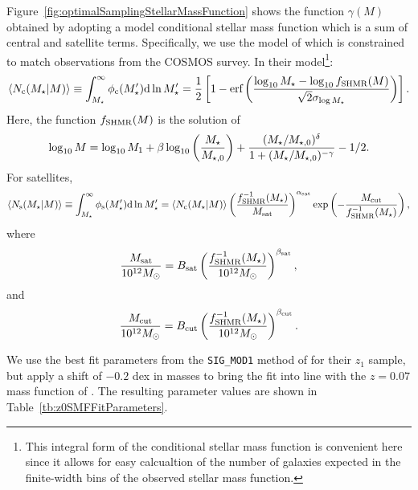 Figure~\ref{fig:optimalSamplingStellarMassFunction} shows the function $\gamma(M)$ obtained by adopting a model conditional stellar mass function which is a sum of central and satellite terms. Specifically, we use the model of \cite{leauthaud_new_2011} which is constrained to match observations from the COSMOS survey. In their model\footnote{This integral form of the conditional stellar mass function is convenient here since it allows for easy calcualtion of the number of galaxies expected in the finite-width bins of the observed stellar mass function.}:
\begin{equation}
 \langle N_{\rm c}(M_\star|M)\rangle \equiv \int_{M_\star}^\infty \phi_{\rm c}(M_\star^\prime) \d \ln M_\star^\prime = {1 \over 2} \left[ 1 - \hbox{erf}\left( {\log_{10}M_\star - \log_{10} f_{\rm SHMR}(M) \over \sqrt{2}\sigma_{\log M_\star}} \right) \right].
\end{equation}
Here, the function $f_{\rm SHMR}(M)$ is the solution of
\begin{equation}
 \log_{10}M = \log_{10}M_1 + \beta \log_{10}\left({M_\star \over M_{\star,0}}\right) + {(M_\star/M_{\star,0})^\delta \over 1 + (M_\star/M_{\star,0})^{-\gamma}} - {1/2}.
\end{equation}
For satellites,
\begin{equation}
 \langle N_{\rm s}(M_\star|M)\rangle \equiv \int_{M_\star}^\infty \phi_{\rm s}(M_\star^\prime) \d \ln M_\star^\prime =  \langle N_{\rm c}(M_\star|M)\rangle \left({f^{-1}_{\rm SHMR}(M_\star) \over M_{\rm sat}}\right)^{\alpha_{\rm sat}} \exp\left(- {M_{\rm cut} \over f^{-1}_{\rm SHMR}(M_\star)} \right),
\end{equation}
where
\begin{equation}
 {M_{\rm sat} \over 10^{12} M_\odot} = B_{\rm sat} \left({f^{-1}_{\rm SHMR}(M_\star) \over 10^{12} M_\odot}\right)^{\beta_{\rm sat}},
\end{equation}
and
\begin{equation}
 {M_{\rm cut} \over 10^{12} M_\odot} = B_{\rm cut} \left({f^{-1}_{\rm SHMR}(M_\star) \over 10^{12} M_\odot}\right)^{\beta_{\rm cut}}.
\end{equation}

We use the best fit parameters from the {\tt SIG\_MOD1} method of \cite{leauthaud_new_2011} for their $z_1$ sample, but apply a shift of $-0.2$ dex in masses to bring the fit into line with the $z=0.07$ mass function of \cite{li_distribution_2009}. The resulting parameter values are shown in Table~\ref{tb:z0SMFFitParameters}.

